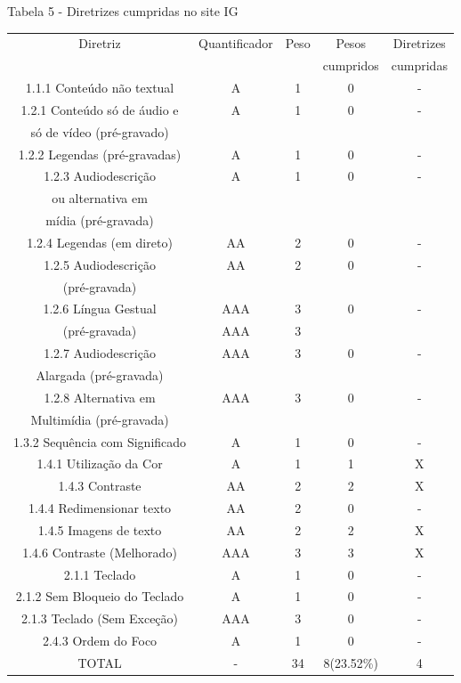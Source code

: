 \documentclass[a4paper]{article}
\begin{document}
\begin{titlepage}
Tabela 5 - Diretrizes cumpridas no site IG\\[-1cm]
\begin{center}
	\fontsize{8pt}{8pt}\selectfont	
	\begin{longtable}{|c|c|c|c|c|}
		\hline
		Diretriz & Quantificador & Peso & Pesos & Diretrizes\\
		& & & cumpridos & cumpridas\\
		\hline
		1.1.1 Conteúdo não textual & A & 1 & 0 & - \\
		\hline
		1.2.1 Conteúdo só de áudio e & A & 1 & 0 & - \\
		só de vídeo (pré-gravado) & & & & \\
		\hline
		1.2.2 Legendas (pré-gravadas) & A & 1 & 0 & - \\
		\hline
		1.2.3 Audiodescrição & A & 1 & 0 & - \\
		ou alternativa em & & & & \\
		mídia (pré-gravada) & & & & \\
		\hline
		1.2.4 Legendas (em direto) & AA & 2 & 0 & - \\
		\hline
		1.2.5 Audiodescrição & AA & 2 & 0 & - \\
		(pré-gravada) & & & & \\
		\hline
		1.2.6 Língua Gestual & AAA & 3 & 0 & - \\
		(pré-gravada) & AAA & 3 & & \\
		\hline
		1.2.7 Audiodescrição & AAA & 3 & 0 & - \\
		Alargada (pré-gravada) & & & & \\
		\hline
		1.2.8 Alternativa em & AAA & 3 & 0 & - \\
		Multimídia (pré-gravada) & & & & \\
		\hline
		1.3.2 Sequência com Significado & A & 1 & 0 & - \\
		\hline
		1.4.1 Utilização da Cor & A & 1 & 1 & X \\
		\hline
		1.4.3 Contraste & AA & 2 & 2 & X \\
		\hline
		1.4.4 Redimensionar texto & AA & 2 & 0 & - \\
		\hline
		1.4.5 Imagens de texto & AA & 2 & 2 & X \\
		\hline
		1.4.6 Contraste (Melhorado) & AAA & 3 & 3 & X \\
		\hline
		2.1.1 Teclado & A & 1 & 0 & - \\
		\hline
		2.1.2 Sem Bloqueio do Teclado & A & 1 & 0 & - \\
		\hline
		2.1.3 Teclado (Sem Exceção) & AAA & 3 & 0 & - \\
		\hline
		2.4.3 Ordem do Foco & A & 1 & 0 & - \\
		\hline
		TOTAL & - & 34 & 8(23.52\%) & 4 \\
		\hline
	\end{longtable}
\end{center}


\end{titlepage}
\end{document}
